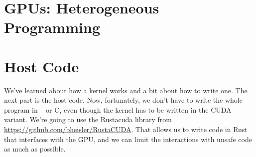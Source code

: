 




\section*{GPUs: Heterogeneous Programming}

\section*{Host Code}
We've learned about how a kernel works and a bit about how to write one. The next part is the host code. Now, fortunately, we don't have to write the whole program in \CPP~ or C, even though the kernel has to be written in the CUDA variant. We're going to use the Rustacuda library from \url{https://github.com/bheisler/RustaCUDA}. That allows us to write code in Rust that interfaces with the GPU, and we can limit the interactions with unsafe code as much as possible.
 
